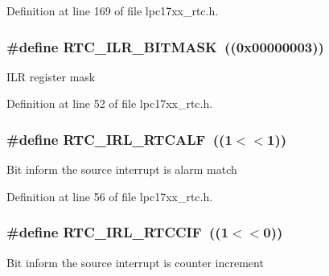 \-Definition at line 169 of file lpc17xx\-\_\-rtc.\-h.

\hypertarget{group___r_t_c___private___macros_ga9c00baff0fca4f8e747fadfe9ee12775}{
\subsubsection[{\-R\-T\-C\-\_\-\-I\-L\-R\-\_\-\-B\-I\-T\-M\-A\-S\-K}]{\setlength{\rightskip}{0pt plus 5cm}\#define {\bf \-R\-T\-C\-\_\-\-I\-L\-R\-\_\-\-B\-I\-T\-M\-A\-S\-K}~((0x00000003))}}\label{group___r_t_c___private___macros_ga9c00baff0fca4f8e747fadfe9ee12775}
\-I\-L\-R register mask 

\-Definition at line 52 of file lpc17xx\-\_\-rtc.\-h.

\hypertarget{group___r_t_c___private___macros_ga237351d2c7f08b447254eff9578eb11e}{
\subsubsection[{\-R\-T\-C\-\_\-\-I\-R\-L\-\_\-\-R\-T\-C\-A\-L\-F}]{\setlength{\rightskip}{0pt plus 5cm}\#define {\bf \-R\-T\-C\-\_\-\-I\-R\-L\-\_\-\-R\-T\-C\-A\-L\-F}~((1$<$$<$1))}}\label{group___r_t_c___private___macros_ga237351d2c7f08b447254eff9578eb11e}
\-Bit inform the source interrupt is alarm match 

\-Definition at line 56 of file lpc17xx\-\_\-rtc.\-h.

\hypertarget{group___r_t_c___private___macros_gaf706fff68e830a082d476467fe71f297}{
\subsubsection[{\-R\-T\-C\-\_\-\-I\-R\-L\-\_\-\-R\-T\-C\-C\-I\-F}]{\setlength{\rightskip}{0pt plus 5cm}\#define {\bf \-R\-T\-C\-\_\-\-I\-R\-L\-\_\-\-R\-T\-C\-C\-I\-F}~((1$<$$<$0))}}\label{group___r_t_c___private___macros_gaf706fff68e830a082d476467fe71f297}
\-Bit inform the source interrupt is counter increment 

